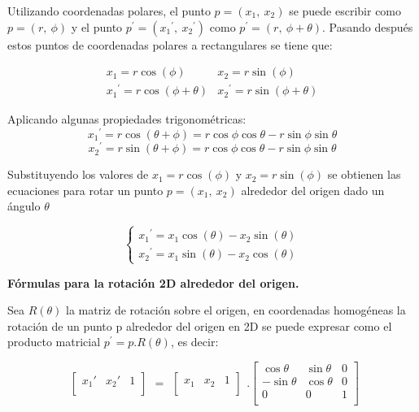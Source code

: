 Utilizando coordenadas polares, el punto $p = (x_{1}, \ x_{2})$ se puede escribir como $p = (r, \ \phi)$ y el punto $p^{\prime} = ({x_{1}}^{\prime},\ {x_{2}}^{\prime})$ como $p^{\prime} = (r, \ \phi + \theta)$. Pasando después estos puntos de coordenadas polares a rectangulares se tiene que:

$$
\begin{array}{rccl}
x_{1} = r \cos(\phi)  & x_{2} = r \sin(\phi)\\
{x_{1}}^{\prime} = r \cos(\phi + \theta)  & {x_{2}}^{\prime} = r \sin(\phi + \theta)
\end{array}
$$

Aplicando algunas propiedades trigonométricas:
$$
{x_{1}}^{\prime} = r \cos(\theta + \phi) = r \cos \phi \cos \theta - r \sin \phi \sin \theta
$$
$$
{x_{2}}^{\prime} = r \sin(\theta + \phi) = r \cos \phi \cos \theta - r \sin \phi \sin \theta
$$

Substituyendo los valores de $x_{1} = r \cos(\phi)$ y $x_{2} = r \sin(\phi)$ se obtienen las ecuaciones para rotar un punto $p = (x_{1}, \ x_{2})$ alrededor del origen dado un ángulo $\theta$

$$
\begin{cases}
{x_{1}}^{\prime} = x_{1} \cos(\theta) -x_{2} \sin(\theta) \\ 
{x_{2}}^{\prime} = x_{1} \sin(\theta) -x_{2} \cos(\theta)
\end{cases}
$$

\begin{center}
\textbf{\footnotesize{Fórmulas para la rotación 2D alrededor del origen.}}
\end{center}

Sea $R(\theta)$ la matriz de rotación sobre el origen, en coordenadas homogéneas la
rotación de un punto p alrededor del origen en 2D se puede expresar como el producto matricial $p^{\prime} = p.R(\theta)$, es decir:

$$
\begin{array}{rccl}
\left[
\begin{array}{rccl}
x_{1}{\prime} & x_{2}{\prime} & 1\\
\end{array}
\right]
\end{array}
=
\begin{array}{rccl}
\left[
\begin{array}{rccl}
x_{1} & x_{2} &  1\\
\end{array}
\right]
\end{array} 
.
\left[
\begin{array}{rccl}
\cos\theta & \sin\theta & 0\\
-\sin\theta & \cos\theta & 0\\
0 & 0 & 1\\
\end{array}
\right]
$$

